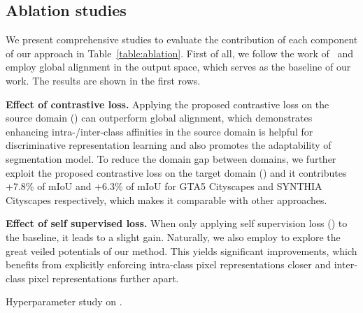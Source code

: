 \documentclass[runningheads]{llncs}
\begin{document}
\subsection{Ablation studies}
\label{sec:ablation}
We present comprehensive studies to evaluate the contribution of each component of our approach in Table~\ref{table:ablation}. First of all, we follow the work of~\cite{tsai2018learning} and employ global alignment in the output space, which serves as the baseline of our work. The results are shown in the first rows. 

{\bf Effect of contrastive loss.} Applying the proposed contrastive loss on the source domain () can outperform global alignment, which demonstrates enhancing intra-/inter-class affinities in the source domain is helpful for discriminative representation learning and also promotes the adaptability of segmentation model. To reduce the domain gap between domains, we further exploit the proposed contrastive loss on the target domain () and it contributes +{7.8}\% of mIoU and +{6.3}\% of mIoU for GTA5  Cityscapes and SYNTHIA  Cityscapes respectively, which makes it comparable with other approaches. 

{\bf Effect of self supervised loss.} When only applying self supervision loss () to the baseline, it leads to a slight gain. Naturally, we also employ  to explore the great veiled potentials of our method. This yields significant improvements, which benefits from explicitly enforcing intra-class pixel representations closer and inter-class pixel representations further apart.


\begin{table*}[t]
    \centering
\begin{minipage}{0.48\textwidth}
        \centering
        \caption{Hyperparameter study on .}
        \label{table:parameter_alpha}
    \end{minipage}
    \quad
    \begin{minipage}{0.48\textwidth}
        \centering
        \caption{Hyperparameter study .}
        \label{table:parameter_lambda}
    \end{minipage}
\end{table*}
\end{document}
